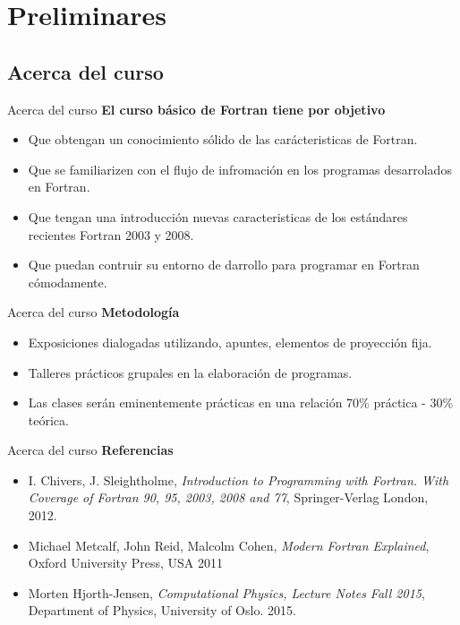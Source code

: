 \section{Preliminares}


\subsection{Acerca del curso}
\begin{frame}[fragile]{Acerca del curso}
  \textbf{El curso básico de Fortran tiene por objetivo}
  \begin{itemize}[<+(1)->]
    \item Que obtengan un conocimiento sólido de las carácteristicas de Fortran.
    \item Que se familiarizen con el flujo de infromación en los programas desarrolados en Fortran.
    \item Que tengan una introducción nuevas caracteristicas de los estándares recientes Fortran 2003 y 2008.
    \item Que puedan contruir su entorno de darrollo para programar en Fortran cómodamente.
  \end{itemize}
\end{frame}


\begin{frame}[fragile]{Acerca del curso}
  \textbf{Metodología}
  \begin{itemize}[<+(1)->]
    \item Exposiciones dialogadas utilizando, apuntes, elementos de proyección fija.
    \item Talleres prácticos grupales en la elaboración de programas.
    \item Las clases serán eminentemente prácticas en una relación 70\% práctica - 30\% teórica.
  \end{itemize}
\end{frame}

\begin{frame}[fragile]{Acerca del curso}
  \textbf{Referencias}
  \begin{itemize}[<+(1)->]
    \item I. Chivers, J. Sleightholme, \textit{Introduction to Programming with Fortran. With Coverage of Fortran 90, 95, 2003, 2008 and 77}, Springer-Verlag London, 2012.
    \item Michael Metcalf, John Reid, Malcolm Cohen, \textit{Modern Fortran Explained}, Oxford University Press, USA 2011
    \item Morten Hjorth-Jensen, \textit{Computational Physics, Lecture Notes Fall 2015}, Department of Physics, University of Oslo. 2015.
  \end{itemize}
\end{frame}

